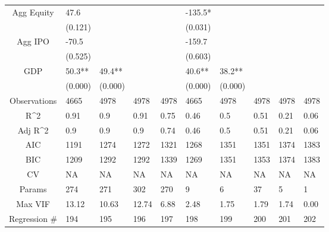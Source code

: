 \documentclass{article}
\begin{document}
\begin{table}[H]
\begin{tabular}{|clllllllll|}
  Agg Equity & 47.6 &  &  &  & -135.5* &  &  &  &  \\ 
   & (0.121) &  &  &  & (0.031) &  &  &  &  \\ 
  Agg IPO & -70.5 &  &  &  & -159.7 &  &  &  &  \\ 
   & (0.525) &  &  &  & (0.603) &  &  &  &  \\ 
  GDP & 50.3** & 49.4** &  &  & 40.6** & 38.2** &  &  &  \\ 
   & (0.000) & (0.000) &  &  & (0.000) & (0.000) &  &  &  \\ 
  \hline 
 Observations & 4665 & 4978 & 4978 & 4978 & 4665 & 4978 & 4978 & 4978 & 4978 \\ 
  R^2 & 0.91 & 0.9 & 0.91 & 0.75 & 0.46 & 0.5 & 0.51 & 0.21 & 0.06 \\ 
  Adj R^2 & 0.9 & 0.9 & 0.9 & 0.74 & 0.46 & 0.5 & 0.51 & 0.21 & 0.06 \\ 
  AIC & 1191 & 1274 & 1272 & 1321 & 1268 & 1351 & 1351 & 1374 & 1383 \\ 
  BIC & 1209 & 1292 & 1292 & 1339 & 1269 & 1351 & 1353 & 1374 & 1383 \\ 
  CV & NA & NA & NA & NA & NA & NA & NA & NA & NA \\ 
  Params & 274 & 271 & 302 & 270 & 9 & 6 & 37 & 5 & 1 \\ 
  Max VIF & 13.12 & 10.63 & 12.74 & 6.88 & 2.48 & 1.75 & 1.79 & 1.74 & 0.00 \\ 
  Regression \# & 194 & 195 & 196 & 197 & 198 & 199 & 200 & 201 & 202 \\ 
   \hline
\end{tabular}
 
\end{table}
\end{document}
